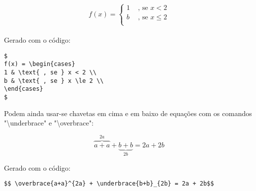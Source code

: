 $$
f(x) = \begin{cases}
1 & \text{ , se } x < 2 \\
b & \text{ , se } x \le 2 \\
\end{cases}
$$
\\
Gerado com o código:
\begin{verbatim}
$
f(x) = \begin{cases}
1 & \text{ , se } x < 2 \\
b & \text{ , se } x \le 2 \\
\end{cases}
$
\end{verbatim}

Podem ainda usar-se chavetas em cima e em baixo de equações com os comandos "\textbackslash underbrace" e "\textbackslash overbrace":

$$ \overbrace{a+a}^{2a} + \underbrace{b+b}_{2b} = 2a + 2b$$

Gerado com o código:
\begin{verbatim}
$$ \overbrace{a+a}^{2a} + \underbrace{b+b}_{2b} = 2a + 2b$$
\end{verbatim}







